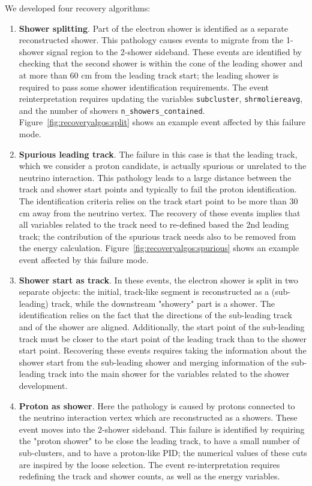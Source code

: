 We developed four recovery algorithms:
\begin{enumerate}
    \item {\bf Shower splitting}. Part of the electron shower is identified as a separate reconstructed shower. This pathology causes \npsel events to migrate from the 1-shower signal region to the 2-shower sideband. These events are identified by checking that the second shower is within the cone of the leading shower and at more than 60 cm from the leading track start; the leading shower is required to pass some shower identification requirements. The event reinterpretation requires updating the variables \texttt{subcluster}, \texttt{shrmoliereavg}, and the number of showers \texttt{n\_showers\_contained}. Figure~\ref{fig:recoveryalgos:split} shows an example event affected by this failure mode.
    \item {\bf Spurious leading track}. The failure in this case is that the leading track, which we consider a proton candidate, is actually spurious or unrelated to the neutrino interaction. This pathology leads to a large distance between the track and shower start points and typically to fail the proton identification. The identification criteria relies on the track start point to be more than 30 cm away from the neutrino vertex. The recovery of these events implies that all variables related to the track need to re-defined based the 2nd leading track; the contribution of the spurious track needs also to be removed from the energy calculation. Figure~\ref{fig:recoveryalgos:spurious} shows an example event affected by this failure mode.
    \item {\bf Shower start as track}. In these events, the electron shower is split in two separate objects: the initial, track-like segment is reconstructed as a (sub-leading) track, while the downstream "showery" part is a shower. The identification relies on the fact that the directions of the sub-leading track and of the shower are aligned. Additionally, the start point of the sub-leading track must be closer to the start point of the leading track than to the shower start point. Recovering these events requires taking the information about the shower start from the sub-leading shower and merging information of the sub-leading track into the main shower for the variables related to the shower development.
    \item {\bf Proton as shower}. Here the pathology is caused by protons connected to the neutrino interaction vertex which are reconstructed as a showers. These event moves into the 2-shower sideband. This failure is identified by requiring the "proton shower" to be close the leading track, to have a small number of sub-clusters, and to have a proton-like PID; the numerical values of these cuts are inspired by the loose selection. The event re-interpretation requires redefining the track and shower counts, as well as the energy variables.
\end{enumerate}

